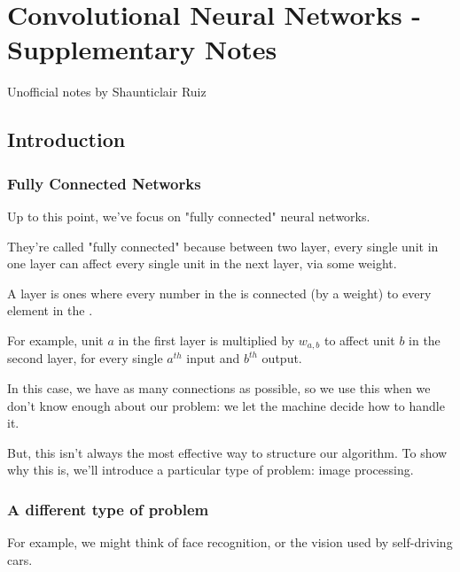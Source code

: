 

\setcounter{chapter}{7-1}

\chapter{Convolutional Neural Networks - Supplementary Notes}

Unofficial notes by Shaunticlair Ruiz


\section{Introduction}

    \subsection{Fully Connected Networks}

        Up to this point, we've focus on "fully connected" neural networks. 
        
        They're called "fully connected" because between two layer, every single unit in one layer can affect every single unit in the next layer, via some weight.\\
        
        \begin{definition}
            A  layer is ones where every number in the  is connected (by a weight) to every element in the . 
        \end{definition}
        
        For example, unit $a$ in the first layer is multiplied by $w_{a,b}$ to affect unit $b$ in the second layer, for every single $a^{th}$ input and $b^{th}$ output.
        
        In this case, we have as many connections as possible, so we use this when we don't know enough about our problem: we let the machine decide how to handle it.
        
        But, this isn't always the most effective way to structure our algorithm. To show why this is, we'll introduce a particular type of problem: image processing. 
    
    \subsection{A different type of problem}
    
        For example, we might think of face recognition, or the vision used by self-driving cars.
        
